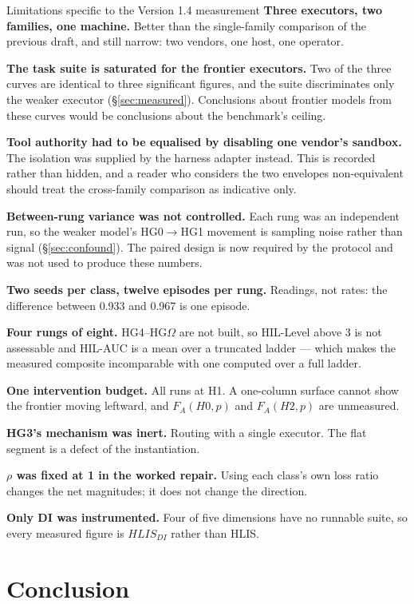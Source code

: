 \documentclass[11pt]{article}
\theoremstyle{definition}
\newcommand{\Om}{\ensuremath{\Omega}}
\begin{document}
\begin{cautionbox}{Limitations specific to the Version 1.4 measurement}
\textbf{Three executors, two families, one machine.} Better than the single-family comparison of the previous draft, and still narrow: two vendors, one host, one operator.

\textbf{The task suite is saturated for the frontier executors.} Two of the three curves are identical to three significant figures, and the suite discriminates only the weaker executor (\S\ref{sec:measured}). Conclusions about frontier models from these curves would be conclusions about the benchmark's ceiling.

\textbf{Tool authority had to be equalised by disabling one vendor's sandbox.} The isolation was supplied by the harness adapter instead. This is recorded rather than hidden, and a reader who considers the two envelopes non-equivalent should treat the cross-family comparison as indicative only.

\textbf{Between-rung variance was not controlled.} Each rung was an independent run, so the weaker model's HG0$\to$HG1 movement is sampling noise rather than signal (\S\ref{sec:confound}). The paired design is now required by the protocol and was not used to produce these numbers.

\textbf{Two seeds per class, twelve episodes per rung.} Readings, not rates: the difference between 0.933 and 0.967 is one episode.

\textbf{Four rungs of eight.} HG4--HG\Om{} are not built, so HIL-Level above 3 is not assessable and HIL-AUC is a mean over a truncated ladder --- which makes the measured composite incomparable with one computed over a full ladder.

\textbf{One intervention budget.} All runs at H1. A one-column surface cannot show the frontier moving leftward, and $F_A(H0,p)$ and $F_A(H2,p)$ are unmeasured.

\textbf{HG3's mechanism was inert.} Routing with a single executor. The flat segment is a defect of the instantiation.

\textbf{$\rho$ was fixed at 1 in the worked repair.} Using each class's own loss ratio changes the net magnitudes; it does not change the direction.

\textbf{Only DI was instrumented.} Four of five dimensions have no runnable suite, so every measured figure is $HLIS_{DI}$ rather than HLIS.
\end{cautionbox}

\section{Conclusion}
\end{document}
